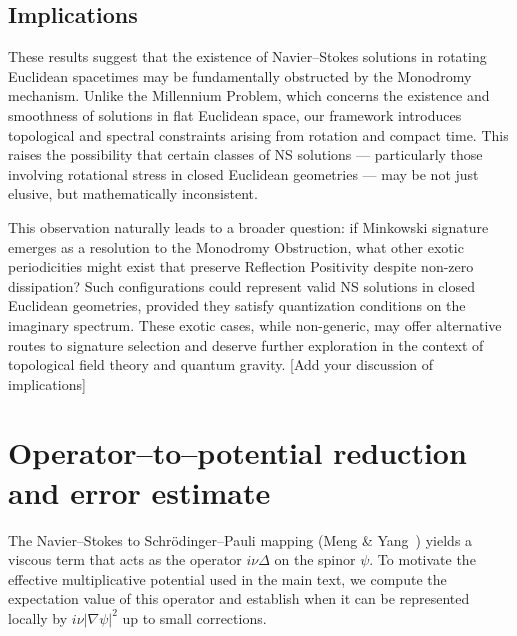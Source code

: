 \documentclass[11pt]{article}
\begin{document}
\subsection{Implications}

These results suggest that the existence of Navier–Stokes solutions in rotating Euclidean spacetimes may be fundamentally obstructed by the Monodromy mechanism. Unlike the Millennium Problem, which concerns the existence and smoothness of solutions in flat Euclidean space, our framework introduces topological and spectral constraints arising from rotation and compact time. This raises the possibility that certain classes of NS solutions — particularly those involving rotational stress in closed Euclidean geometries — may be not just elusive, but mathematically inconsistent.

This observation naturally leads to a broader question: if Minkowski signature emerges as a resolution to the Monodromy Obstruction, what other exotic periodicities might exist that preserve Reflection Positivity despite non-zero dissipation? Such configurations could represent valid NS solutions in closed Euclidean geometries, provided they satisfy quantization conditions on the imaginary spectrum. These exotic cases, while non-generic, may offer alternative routes to signature selection and deserve further exploration in the context of topological field theory and quantum gravity.
[Add your discussion of implications]




\appendix
\section{Operator--to--potential reduction and error estimate}
\label{app:operator-to-potential}

The Navier--Stokes to Schr\"odinger--Pauli mapping (Meng \& Yang~\cite{MengYang2024}) yields a viscous term that acts as the operator $i\nu\Delta$ on the spinor $\psi$.  
To motivate the effective multiplicative potential used in the main text, we compute the expectation value of this operator and establish when it can be represented locally by $i\nu|\nabla\psi|^2$ up to small corrections.
\end{document}
